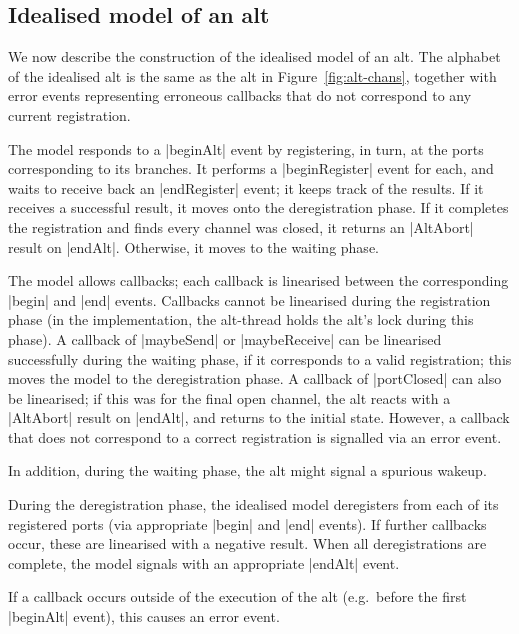 


\subsection{Idealised model of an alt}
\label{sec:idealisedAlt}

We now describe the construction of the idealised model of an alt.  
%
The alphabet of the idealised alt is the same as the alt in
Figure~\ref{fig:alt-chans}, together with error events representing erroneous
callbacks that do not correspond to any current registration.

The model responds to a |beginAlt| event by registering, in turn, at the ports
corresponding to its branches.  It performs a |beginRegister| event for each,
and waits to receive back an |endRegister| event; it keeps track of the
results.  If it receives a successful result, it moves onto the deregistration
phase.  If it completes the registration and finds every channel was closed,
it returns an |AltAbort| result on |endAlt|.  Otherwise, it moves to the
waiting phase.

The model allows callbacks; each callback is linearised between the
corresponding |begin| and |end| events.  Callbacks cannot be linearised during
the registration phase (in the implementation, the alt-thread holds the alt's
lock during this phase).  A callback of |maybeSend| or |maybeReceive| can be
linearised successfully during the waiting phase, if it corresponds to a valid
registration; this moves the model to the deregistration phase.  A callback of
|portClosed| can also be linearised; if this was for the final open channel,
the alt reacts with a |AltAbort| result on |endAlt|, and returns to the initial
state.  However, a callback that does not correspond to a correct registration
is signalled via an error event.

In addition, during the waiting phase, the alt might signal a spurious
wakeup. 

During the deregistration phase, the idealised model deregisters from each of
its registered ports (via appropriate |begin| and |end| events).  If further
callbacks occur, these are linearised with a negative result.  When all
deregistrations are complete, the model signals with an appropriate |endAlt|
event.

If a callback occurs outside of the execution of the alt (e.g.~before the
first |beginAlt| event), this causes an error event. 

